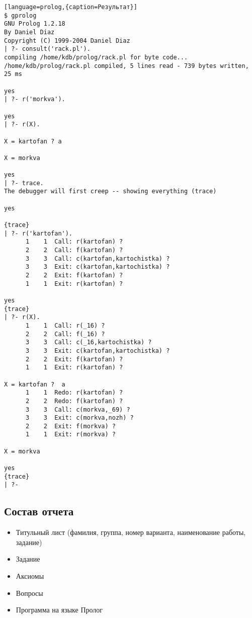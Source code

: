 \documentclass[a4paper,12pt]{article}
\begin{document}
\begin{lstlisting}[language=prolog,{caption=Результат}]
$ gprolog
GNU Prolog 1.2.18
By Daniel Diaz
Copyright (C) 1999-2004 Daniel Diaz
| ?- consult('rack.pl').
compiling /home/kdb/prolog/rack.pl for byte code...
/home/kdb/prolog/rack.pl compiled, 5 lines read - 739 bytes written, 25 ms

yes
| ?- r('morkva').

yes
| ?- r(X).

X = kartofan ? a

X = morkva

yes
| ?- trace.
The debugger will first creep -- showing everything (trace)

yes

{trace}
| ?- r('kartofan').
      1    1  Call: r(kartofan) ? 
      2    2  Call: f(kartofan) ? 
      3    3  Call: c(kartofan,kartochistka) ? 
      3    3  Exit: c(kartofan,kartochistka) ? 
      2    2  Exit: f(kartofan) ? 
      1    1  Exit: r(kartofan) ? 

yes
{trace}
| ?- r(X).         
      1    1  Call: r(_16) ? 
      2    2  Call: f(_16) ? 
      3    3  Call: c(_16,kartochistka) ? 
      3    3  Exit: c(kartofan,kartochistka) ? 
      2    2  Exit: f(kartofan) ? 
      1    1  Exit: r(kartofan) ? 

X = kartofan ?  a
      1    1  Redo: r(kartofan) ? 
      2    2  Redo: f(kartofan) ? 
      3    3  Call: c(morkva,_69) ? 
      3    3  Exit: c(morkva,nozh) ? 
      2    2  Exit: f(morkva) ? 
      1    1  Exit: r(morkva) ? 

X = morkva

yes
{trace}
| ?- 
\end{lstlisting}

\subsection{Состав отчета}
\begin{itemize}
	\item Титульный лист (фамилия, группа, номер варианта, наименование работы, задание)
	\item Задание
	\item Аксиомы
	\item Вопросы
	\item Программа на языке Пролог
\end{itemize}
\end{document}
